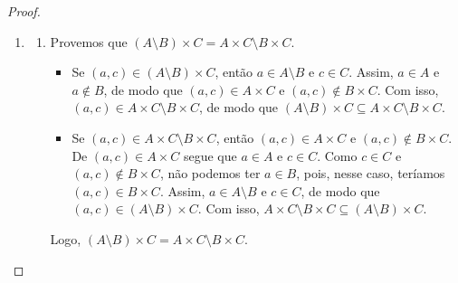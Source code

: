 \begin{proof}
\begin{enumerate}[leftmargin=*, align=left, label=\textbf{(\alph*)}]
\begin{enumerate}[label=\roman*.]
                        \begin{itemize}
                            \item[($\subseteq$)] Se $(a,b) \in A \times (B \cap C)$, então $a \in A$ e $b \in B \cap C$. Assim, $b \in B$ e $b \in C$, de modo que $(a,b) \in A \times B$ e $(a,b) \in A \times C$. Com isso, $(a,b) \in A \times B \cap A \times C$, de modo que $A \times (B \cap C) \subseteq A \times B \cap A \times C$.
                            \item[($\supseteq$)] Se $(a,b) \in A \times B \cap A \times C$, então $(a,b) \in A \times B$ e $(a,b) \in A \times C$. Assim, $a \in A$, $b \in B$ e $b \in C$, de modo que $b \in B \cap C$. Com isso, $(a,b) \in A \times (B \cap C)$, de modo que $A \times B \cap A \times C \subseteq A \times (B \cap C)$.
                        \end{itemize}
                    Logo, $A \times (B \cap C) = A \times B \cap A \times C$.
                \end{enumerate}
            Logo, vale a distributividade entre $\times$ e $\cap$. \blackproof
            \item
                \begin{enumerate}[label=\roman*.]
                    \item Provemos que $(A \setminus B) \times C = A \times C \setminus B \times C$.
                        \begin{itemize}
                            \item[($\subseteq$)] Se $(a,c) \in (A \setminus B) \times C$, então $a \in A \setminus B$ e $c \in C$. Assim, $a \in A$ e $a \notin B$, de modo que $(a,c) \in A \times C$ e $(a,c) \notin B \times C$. Com isso, $(a,c) \in A \times C \setminus B \times C$, de modo que $(A \setminus B) \times C \subseteq A \times C \setminus B \times C$.
                            \item[($\supseteq$)] Se $(a,c) \in A \times C \setminus B \times C$, então $(a,c) \in A \times C$ e $(a,c) \notin B \times C$. De $(a,c) \in A \times C$ segue que $a \in A$ e $c \in C$. Como $c \in C$ e $(a,c) \notin B \times C$, não podemos ter $a \in B$, pois, nesse caso, teríamos $(a,c) \in B \times C$. Assim, $a \in A \setminus B$ e $c \in C$, de modo que $(a,c) \in (A \setminus B) \times C$. Com isso, $A \times C \setminus B \times C \subseteq (A \setminus B) \times C$.
                        \end{itemize}
                    Logo, $(A \setminus B) \times C = A \times C \setminus B \times C$.

\end{enumerate}
\end{enumerate}
\end{proof}

